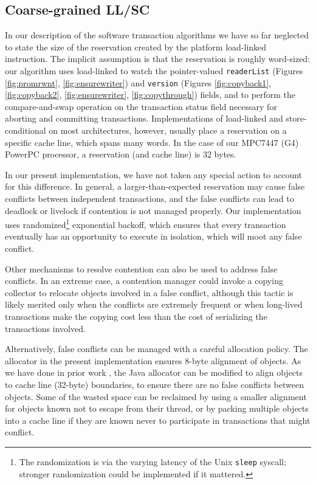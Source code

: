\subsection{Coarse-grained LL/SC}\label{sec:coarseLL}
In our description of the software transaction algorithms we have so
far neglected to state the size of the reservation created by the
platform load-linked instruction.  The implicit assumption is that the
reservation is roughly word-sized: our algorithm uses load-linked to
watch the pointer-valued \texttt{readerList}
(Figures \ref{fig:promrwnt}, \ref{fig:ensurewriter}) and
\texttt{version} (Figures \ref{fig:copyback1}, \ref{fig:copyback2},
\ref{fig:ensurewriter},
\ref{fig:copythrough}) fields, and to perform the compare-and-swap
operation on the transaction status field necessary for aborting and
committing transactions.  Implementations of load-linked and
store-conditional on most architectures, however, usually place a reservation on
a specific cache line, which spans many words.  In the case of our
MPC7447 (G4) PowerPC processor, a reservation (and cache line) is 32
bytes.

In our present implementation, we have not taken any special action to
account for this difference.  In general, a larger-than-expected reservation may
cause false conflicts between independent transactions, and the false
conflicts can
lead to deadlock or livelock if contention is not managed properly.
Our implementation uses randomized\footnote{The randomization is via
  the varying latency of the Unix \texttt{sleep} syscall; stronger
  randomization could be implemented if it mattered.}
 exponential backoff, which ensures that every transaction
 eventually has an opportunity to execute in isolation, which will
 moot any false conflict.

Other mechanisms to resolve contention can also be used to address
false conflicts.  In an extreme case, a contention manager could
invoke a copying collector to relocate objects involved in a false
conflict, although this tactic is likely merited only when the conflicts are
extremely frequent or when long-lived transactions make the
copying cost less than the cost of serializing the transactions involved.

Alternatively, false conflicts can be managed with a careful allocation
policy.  The allocator in the present implementation ensures 8-byte
alignment of objects.  As we have done in prior work
\cite{WitchelLaAnAs01}, the Java allocator can be modified to align
objects to cache line (32-byte) boundaries, to ensure there are no
false conflicts between objects.  Some of the wasted space can be
reclaimed by using a smaller alignment for objects known not to escape
from their thread, or by packing multiple objects into a cache line
if they are known never to participate in transactions that might
conflict.

